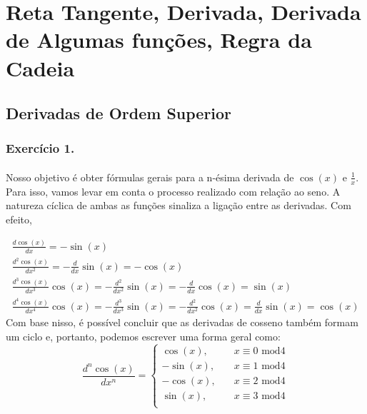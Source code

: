 \section{Reta Tangente, Derivada, Derivada de Algumas fun\c c\~oes, Regra da Cadeia}
\subsection[Derivadas de Ordem Superior]{Derivadas de Ordem Superior}
\subsubsection{Exerc\'icio 1.}
\paragraph{} Nosso objetivo \'e obter f\'ormulas gerais para a n-\'esima derivada de $\cos(x) \text{ e } \frac{1}{x}$. Para isso, vamos levar em conta 
o processo realizado com rela\c c\~ao ao seno. A natureza c\'iclica de ambas as fun\c c\~oes sinaliza
a liga\c c\~ao entre as derivadas. Com efeito, 

$$
\begin{array}{ll}
	\frac{d \cos(x)}{d x} = -\sin(x) \\
	\frac{d^2 \cos(x)}{d x^2} = -\frac{d}{dx}\sin(x) = -\cos(x)\\
	\frac{d^3 \cos(x)}{d x^3}\cos(x) = -\frac{d^2}{dx^2}\sin(x) = -\frac{d}{dx}\cos(x) = \sin(x)\\
	\frac{d^4 \cos(x)}{d x^4}\cos(x) = -\frac{d^3}{dx^3}\sin(x) = -\frac{d^2}{dx^2}\cos(x) = \frac{d}{dx}\sin(x) = \cos(x)
\end{array}
$$  
Com base nisso, \'e poss\'ivel concluir que as derivadas de cosseno tamb\'em formam um ciclo e, portanto, podemos escrever uma forma geral como:
$$
\frac{d^n \cos(x)}{d x^n} = \left\{
\begin{array}{ll}
	\cos(x), &\quad x\equiv 0\text{ mod}4 \\
	-\sin(x), &\quad x\equiv 1\text{ mod}4\\
	-\cos(x), &\quad x\equiv 2\text{ mod}4\\
	\sin(x), &\quad x\equiv 3\text{ mod}4 \\
\end{array}
\right.
$$